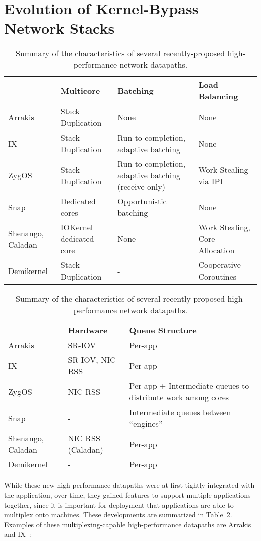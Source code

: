 \section{Evolution of Kernel-Bypass Network Stacks}
\begin{table}
    \small
    \begin{tabular}{p{2cm} p{3cm} p{3.5cm} p{3cm}}
        \hline
                         & Multicore & Batching & Load Balancing \\
        \hline
        Arrakis          & Stack Duplication & None & None \\
        IX               & Stack Duplication & Run-to-completion, adaptive batching & None \\
        ZygOS            & Stack Duplication & Run-to-completion, adaptive batching (receive only) & Work Stealing via IPI \\
        Snap             & Dedicated cores & Opportunistic batching & None \\
        Shenango, Caladan& IOKernel dedicated core & None & Work Stealing, Core Allocation \\
        Demikernel       & Stack Duplication & - & Cooperative Coroutines \\
        \hline
    \end{tabular}
    \begin{tabular}{p{2cm} p{3cm} p{6.5cm}}
        \hline
                         & Hardware & Queue Structure \\
        \hline
        Arrakis          & SR-IOV & Per-app \\
        IX               & SR-IOV, NIC RSS & Per-app \\
        ZygOS            & NIC RSS & Per-app + Intermediate queues to distribute work among cores \\
        Snap             & - & Intermediate queues between ``engines'' \\
        Shenango, Caladan& NIC RSS (Caladan) & Per-app \\
        Demikernel       & - & Per-app \\
        \hline
    \end{tabular}
    \caption{Summary of the characteristics of several recently-proposed high-performance network datapaths. }
    \label{t:systems}
\end{table}
While these new high-performance datapaths were at first tightly integrated with the application, over time, they gained features to support multiple applications together, since it is important for deployment that applications are able to multiplex onto machines. These developments are summarized in Table~\ref{t:systems}. Examples of these multiplexing-capable high-performance datapaths are Arrakis~\cite{arrakis} and IX~\cite{ix}:
